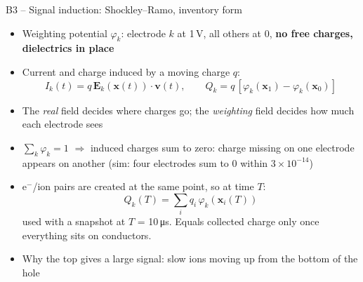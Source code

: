 \documentclass[aspectratio=169,11pt]{beamer}
\newcommand{\backlink}[1]{\hfill\hyperlink{#1}{\beamerreturnbutton{back}}}
\begin{document}
\begin{frame}[label=b-sr]{B3 -- Signal induction: Shockley--Ramo, inventory form}
  \small
  \begin{itemize}
    \item Weighting potential $\varphi_k$: electrode $k$ at 1\,V, all others at 0, \textbf{no free charges, dielectrics in place}
    \item Current and charge induced by a moving charge $q$:
      \[ I_k(t) = q\,\mathbf{E}_k(\mathbf{x}(t))\cdot\mathbf{v}(t),\qquad Q_k = q\,[\varphi_k(\mathbf{x}_1)-\varphi_k(\mathbf{x}_0)] \]
    \item The \emph{real} field decides where charges go; the \emph{weighting} field decides how much each electrode sees
    \item $\sum_k\varphi_k = 1$ $\Rightarrow$ induced charges sum to zero: charge missing on one electrode appears on another (sim: four electrodes sum to 0 within $3\times10^{-14}$)
    \item e$^-$/ion pairs are created at the same point, so at time $T$:
      \[ Q_k(T) = \sum_i q_i\,\varphi_k(\mathbf{x}_i(T)) \]
      used with a snapshot at $T$ = 10\,\si{\micro s}. Equals collected charge only once everything sits on conductors.
    \item Why the top gives a large signal: slow ions moving up from the bottom of the hole
  \end{itemize}
  \backlink{m-glass}
\end{frame}
\end{document}
